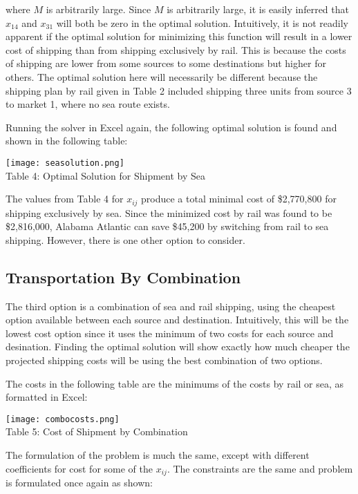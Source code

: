 \documentclass[12pt,letterpaper]{article}
\begin{document}
where $M$ is arbitrarily large.  Since $M$ is arbitrarily large, it is easily inferred that $x_{14}$ and $x_{31}$ will
both be zero in the optimal solution.  Intuitively, it is not readily apparent if the optimal solution for minimizing
this function will result in a lower cost of shipping than from shipping exclusively by rail.  This is because the
costs of shipping are lower from some sources to some destinations but higher for others.  The optimal solution here
will necessarily be different because the shipping plan by rail given in Table 2 included shipping three units from
source 3 to market 1, where no sea route exists.

Running the solver in Excel again, the following optimal solution is found and shown in the following table:

\begin{center}
\texttt{[image: seasolution.png]}\\
Table 4: Optimal Solution for Shipment by Sea
\end{center}

The values from Table 4 for $x_{ij}$ produce a total minimal cost of \$2,770,800 for shipping exclusively by sea. Since
the minimized cost by rail was found to be \$2,816,000, Alabama Atlantic can save \$45,200 by switching from rail to
sea shipping.  However, there is one other option to consider.

\subsection{Transportation By Combination}
The third option is a combination of sea and rail shipping, using the cheapest option available between each source
and destination.  Intuitively, this will be the lowest cost option since it uses the minimum of two costs for each
source and desination.  Finding the optimal solution will show exactly how much cheaper the projected shipping costs
will be using the best combination of two options.

The costs in the following table are the minimums of the costs by rail or sea, as formatted in Excel:

\begin{center}
\texttt{[image: combocosts.png]}\\
Table 5: Cost of Shipment by Combination
\end{center}

The formulation of the problem is much the same, except with different coefficients for cost for some of the $x_{ij}$.
The constraints are the same and problem is formulated once again as shown:
\end{document}
